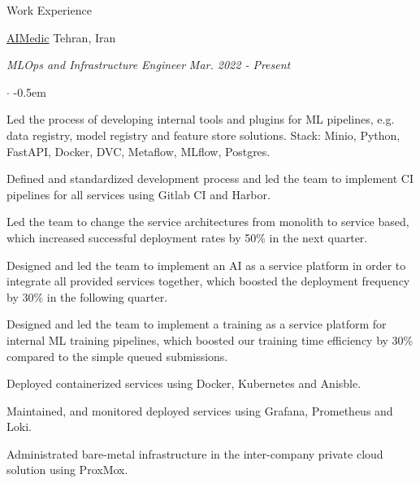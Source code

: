 \documentclass[../professional-cv.tex]{subfiles}
\begin{document}
	\begin{rSection}{Work Experience}
		
		\begin{rWorkSection}
			{\href{https://aimedic.co/}{AIMedic}}
			{Tehran, Iran}
			
			\vspace{-1em}
			{\em MLOps and Infrastructure Engineer} \hfill {\em Mar. 2022 - Present} \hspace{10pt}
			\normalfont
			\begin{list}{$\cdot$}{\leftmargin=10pt\normalfont \rightmargin=20pt}
				\itemsep -0.5em
				\item Led the process of developing internal tools and plugins for ML pipelines, e.g. data registry, model registry and feature store solutions. Stack: Minio, Python, FastAPI, Docker, DVC, Metaflow, MLflow, Postgres.
				\item Defined and standardized development process and led the team to implement CI pipelines for all services using Gitlab CI and Harbor.
				\item Led the team to change the service architectures from monolith to service based, which increased successful deployment rates by 50\% in the next quarter.
				\item Designed and led the team to implement an AI as a service platform in order to integrate all provided services together, which boosted the deployment frequency by 30\% in the following quarter.
				\item Designed and led the team to implement a training as a service platform for internal ML training pipelines, which boosted our training time efficiency by 30\% compared to the simple queued submissions.
				\item Deployed containerized services using Docker, Kubernetes and Anisble.
				\item Maintained, and monitored deployed services using Grafana, Prometheus and Loki.
				\item Administrated bare-metal infrastructure in the inter-company private cloud solution using ProxMox.
						

\end{list}
\end{rWorkSection}
\end{rSection}
\end{document}
